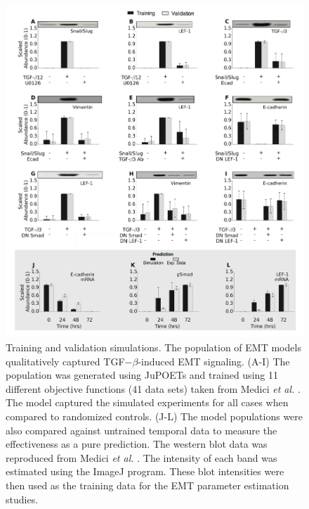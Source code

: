 \documentclass[11pt,letterpaper]{article}
\begin{document}
\clearpage

\begin{figure}
\includegraphics [width=1.0\linewidth] {./figs/Fig2_training.pdf}
\caption{Training and validation simulations. The population of EMT models qualitatively captured TGF$-\beta$-induced EMT signaling.
(A-I) The population was generated using JuPOETs and trained using 11 different objective functions (41 data sets) taken from Medici \emph{et al.} \cite{Medici:2008fk}.
The model captured the simulated experiments for all cases when compared to randomized controls.
(J-L)  The model populations were also compared against untrained temporal data to measure the effectiveness as a pure prediction.
The western blot data was reproduced from Medici \emph{et al.} \cite{Medici:2008fk}. The intensity of each band was estimated using the ImageJ program.
These blot intensities were then used as the training data for the EMT parameter estimation studies. }\label{fg:F2}
\end{figure}

\clearpage
\end{document}
